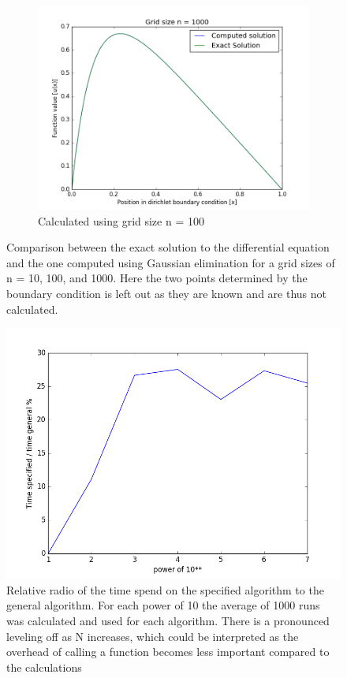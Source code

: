 \documentclass[a4paper,11pt]{article}
\begin{document}
{\begin{figure}[H]
\begin{subfigure}[b]{0.3\textwidth}
		\includegraphics[scale=0.3]{n=1000}
		\caption{Calculated using grid size n = 100}
		\label{fig:n=1000}
	\end{subfigure}
	\caption{Comparison between the exact solution to the differential equation and the one computed using Gaussian elimination for a grid sizes of n = 10, 100, and 1000. Here the two points determined by the boundary condition is left out as they are known and are thus not calculated.}
	\label{fig:exact_vs_calculated}
\end{figure}

\begin{figure}
	\centering
	\includegraphics[scale=0.5]{Time_relative}
	\caption{Relative radio of the time spend on the specified algorithm to the general algorithm. For each power of 10 the average of 1000 runs was calculated and used for each algorithm. There is a pronounced leveling off as N increases, which could be interpreted as the overhead of calling a function becomes less important compared to the calculations}
	\label{fig:Time_relative}
\end{figure}

}
\end{document}
